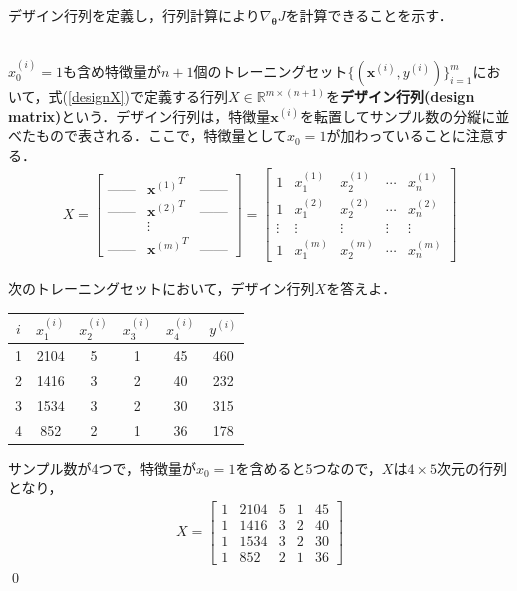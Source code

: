 デザイン行列を定義し，行列計算により$\nabla_{{\bm \theta}}J$を計算できることを示す．

\begin{defi}[デザイン行列]
　\\
$x_0^{(i)}=1$も含め特徴量が$n+1$個のトレーニングセット$\{({\bm x}^{(i)},y^{(i)})\}_{i=1}^m$において，式(\ref{designX})で定義する行列$X \in \mathbb{R}^{m\times (n+1)}$を{\bf デザイン行列(design matrix)}という．デザイン行列は，特徴量${\bm x}^{(i)}$を転置してサンプル数の分縦に並べたもので表される．ここで，特徴量として$x_0=1$が加わっていることに注意する．
\begin{align}
X = 
\begin{bmatrix}
\mbox{------} & {{\bm x}^{(1)}}^T & \mbox{------} \\
\mbox{------} & {{\bm x}^{(2)}}^T & \mbox{------} \\
 & \vdots & \\
\mbox{------} & {{\bm x}^{(m)}}^T & \mbox{------}
\end{bmatrix}
=
\begin{bmatrix}
1 & x_1^{(1)} & x_2^{(1)} & \cdots & x_n^{(1)} \\
1 & x_1^{(2)} & x_2^{(2)} & \cdots & x_n^{(2)} \\
\vdots & \vdots & \vdots & \vdots & \vdots \\
1 & x_1^{(m)} & x_2^{(m)} & \cdots & x_n^{(m)} 
\end{bmatrix} \label{designX}
\end{align}
\end{defi}

\begin{qu}
次のトレーニングセットにおいて，デザイン行列$X$を答えよ．
\begin{table}[h]
\centering
\begin{tabular}{cccccc}
\hline
$i$ &$x_1^{(i)}$ &$x_2^{(i)}$ &$x_3^{(i)}$ &$x_4^{(i)}$ & $y^{(i)}$ \\ \hline
1 & 2104 & 5 & 1 & 45 & 460 \\
2 & 1416 & 3 & 2 & 40 & 232 \\
3 & 1534 & 3 & 2 & 30 & 315 \\
4 & 852  & 2 & 1 & 36 & 178 \\ \hline
\end{tabular}
\end{table}
\end{qu}
\begin{ans}
サンプル数が4つで，特徴量が$x_0=1$を含めると5つなので，$X$は$4\times 5$次元の行列となり，
\begin{align*}
X=
\begin{bmatrix}
1 & 2104 & 5 & 1 & 45 \\
1 & 1416 & 3 & 2 & 40 \\
1 & 1534 & 3 & 2 & 30 \\
1 & 852  & 2 & 1 & 36 
\end{bmatrix}
\end{align*}\qed
\end{ans}

